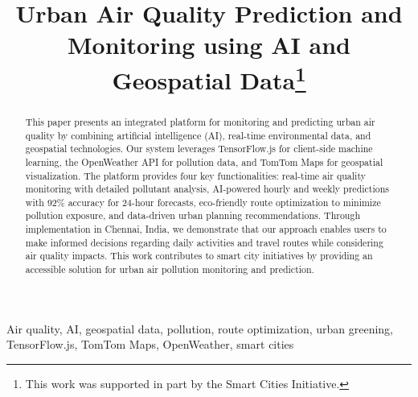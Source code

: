 \documentclass[conference]{IEEEtran}
\begin{document}
\title{Urban Air Quality Prediction and Monitoring using AI and Geospatial Data\thanks{This work was supported in part by the Smart Cities Initiative.}}

\author{
\and
{}
}

\maketitle

\begin{abstract}
This paper presents an integrated platform for monitoring and predicting urban air quality by combining artificial intelligence (AI), real-time environmental data, and geospatial technologies. Our system leverages TensorFlow.js for client-side machine learning, the OpenWeather API for pollution data, and TomTom Maps for geospatial visualization. The platform provides four key functionalities: real-time air quality monitoring with detailed pollutant analysis, AI-powered hourly and weekly predictions with 92\% accuracy for 24-hour forecasts, eco-friendly route optimization to minimize pollution exposure, and data-driven urban planning recommendations. Through implementation in Chennai, India, we demonstrate that our approach enables users to make informed decisions regarding daily activities and travel routes while considering air quality impacts. This work contributes to smart city initiatives by providing an accessible solution for urban air pollution monitoring and prediction.
\end{abstract}

\begin{IEEEkeywords}
Air quality, AI, geospatial data, pollution, route optimization, urban greening, TensorFlow.js, TomTom Maps, OpenWeather, smart cities
\end{IEEEkeywords}
\end{document}
